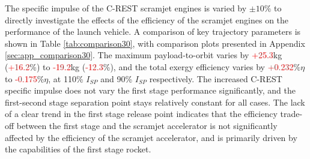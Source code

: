 \noindent
The specific impulse of the C-REST scramjet engines is varied by $\pm10\%$ to directly investigate the effects of the efficiency of the scramjet engines on the performance of the launch vehicle. A comparison of key trajectory parameters is shown in Table \ref{tab:comparison30}, with comparison plots presented in Appendix \ref{sec:app_comparison30}. The maximum payload-to-orbit varies by \textcolor{red}{+25.3}kg (\textcolor{red}{+16.2}\%) to \textcolor{red}{-19.2}kg (\textcolor{red}{-12.3}\%), and the total exergy efficiency varies by \textcolor{red}{+0.232}\%$\eta$ to \textcolor{red}{-0.175}\%$\eta$, at 110\% $I_{SP}$ and 90\% $I_{SP}$ respectively. 
The increased C-REST specific impulse does not vary the first stage performance significantly, and the first-second stage separation point stays relatively constant for all cases.   
The lack of a clear trend in the first stage release point indicates that the efficiency trade-off between the first stage and the scramjet accelerator is not significantly affected by the efficiency of the scramjet accelerator, and is primarily driven by the capabilities of the first stage rocket. 

